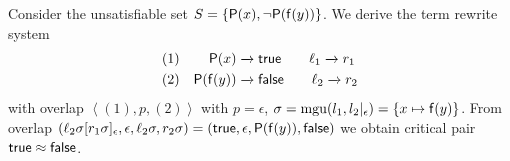 \begin{example}
	Consider the unsatisfiable set \( S = \{ \mathsf{P}(x), \lnot \mathsf{P}(\mathsf{f}(y)) \} \).
	We derive the term rewrite system
	\begin{align*}
	(1)&&
		\mP(x) &\rwStep \mathsf{true}
		\tag*{\( \ell_1 \rwStep r_1 \)}
		\\
	(2)&&
		\mP(\mf(y)) &\rwStep \mathsf{false}
		\tag*{\( \ell_2 \rwStep r_2 \)}
	\end{align*}
	with overlap \( \left<(1),p,(2)\right> \) with \( p=\epsilon \),
	\( \sigma = \operatorname{mgu}(l_1, l_2|_\epsilon) = \{ x\mapsto \mathsf{f}(y)\} \).
	From overlap $\left(\ell_2\sigma[r_1\sigma]_\epsilon, \epsilon, \ell_2\sigma, r_2\sigma\right)
	= (\mathsf{true}, \epsilon, \mathsf{P}(\mathsf{f}(y)), \mathsf{false})$
	we obtain critical pair \( \mathsf{true} \approx \mathsf{false} \).

\end{example}




